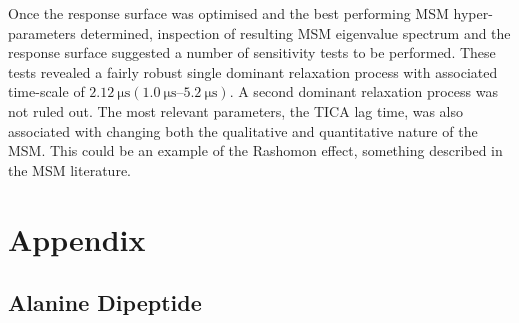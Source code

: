 Once the response surface was optimised and the best performing MSM hyper-parameters determined,  inspection of resulting MSM eigenvalue spectrum and the response surface suggested a number of sensitivity tests to be performed.  These tests revealed a fairly robust single dominant relaxation process with associated time-scale of $\SI{2.12}{\micro\second} (\SIrange{1.0}{5.2}{\micro\second})$. A second dominant relaxation process was not ruled out. The most relevant parameters, the TICA lag time, was also associated with changing both the qualitative and quantitative nature of the MSM. This could be an example of the Rashomon effect, something described in the MSM literature. 








\section{Appendix}\label{app:msm_opt}

\subsection{Alanine Dipeptide}

